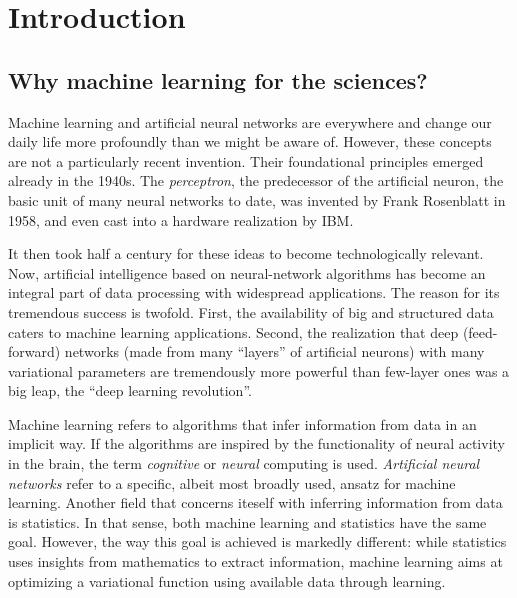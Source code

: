 \section{Introduction}
\subsection{Why machine learning for the sciences?}
Machine learning and artificial neural networks are everywhere and change our daily life more profoundly than we might be aware of.
However, these concepts are not a particularly recent invention. Their foundational principles emerged already in the 1940s. The \emph{perceptron}, the predecessor of the artificial neuron, the basic unit of many neural networks to date, was invented by Frank Rosenblatt in 1958, and even cast into a hardware realization by IBM. 

It then took half a century for these ideas to become technologically relevant. Now, artificial intelligence based on neural-network algorithms has become an integral part of data processing with widespread applications. The reason for its tremendous success is twofold. First, the availability of big and structured data caters to machine learning applications. Second, the realization that deep (feed-forward) networks (made from many ``layers'' of artificial neurons) with many variational parameters are tremendously more powerful than few-layer ones was a big leap, the ``deep learning revolution''.

Machine learning refers to algorithms that infer information from data in an implicit way. If the algorithms are inspired by the functionality of neural activity in the brain, the term \emph{cognitive} or \emph{neural} computing is used. \emph{Artificial neural networks} refer to a specific, albeit most broadly used, ansatz for machine learning.
Another field that concerns iteself with inferring information from data is statistics. In that sense, both machine learning and statistics have the same goal. However, the way this goal is achieved is markedly different: while statistics uses insights from mathematics to extract information, machine learning aims at optimizing a variational function using available data through learning.

